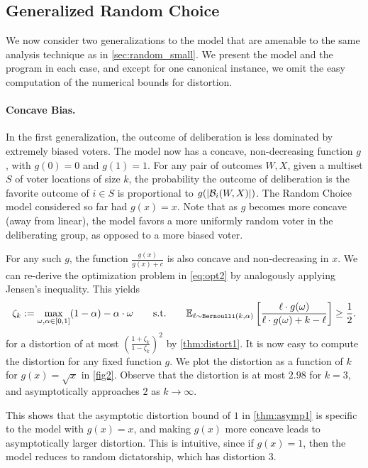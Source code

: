 

\subsection{Generalized Random Choice}
\label{sec:general}
We now consider two generalizations to the model that are amenable to the same analysis technique as in \cref{sec:random_small}. We present the model and the program in each case, and except for one canonical instance, we omit the easy computation of the numerical bounds for distortion. 

\paragraph{Concave Bias.} In the first generalization, the outcome of deliberation is less dominated by extremely biased voters. The model now has a concave, non-decreasing function $g$, with $g(0) = 0$ and $g(1) = 1$. For any pair of outcomes $W,X$, given a multiset $S$ of voter locations of size $k$, the probability the outcome of deliberation is the favorite outcome of $i \in S$ is proportional to $g(|\mathcal{B}_i(W,X)|)$. The Random Choice model considered so far had $g(x) = x$. Note that as $g$ becomes more concave (away from linear), the model favors a more uniformly random voter in the deliberating group, as opposed to a more biased voter.

For any such $g$, the function $\frac{g(x)}{g(x) + c}$ is also concave and non-decreasing in $x$. We can re-derive the optimization problem in \cref{eq:opt2} by analogously applying Jensen's inequality. This yields
\begin{equation} 
\label{eq:opt3}
\zeta_k := \max_{\omega, \alpha \in [0,1]} (1-\alpha) - \alpha \cdot \omega \qquad \mbox{s.t.} \qquad \mathbb{E}_{\ell \sim \mathtt{Bernoulli}(k,\alpha)} \left[ \frac{\ell \cdot g(\omega)}{\ell \cdot g(\omega) + k-\ell } \right] \ge \frac{1}{2}.
\end{equation}
for a distortion of at most $\left( \frac{1+\zeta_k}{1-\zeta_k}\right)^2$ by \cref{thm:distort1}. It is now easy to compute the distortion for any fixed function $g$. We plot the distortion as a function of $k$ for $g(x) = \sqrt{x}$ in \cref{fig2}. Observe that the distortion is at most $2.98$ for $k = 3$, and asymptotically approaches $2$ as $k \rightarrow \infty$.  

This shows that the asymptotic distortion bound of $1$ in \cref{thm:asymp1} is specific to the model with $g(x) = x$, and making $g(x)$ more concave leads to asymptotically larger distortion. This is intuitive, since if  $g(x) = 1$, then the model reduces to random dictatorship, which has distortion  $3$.

